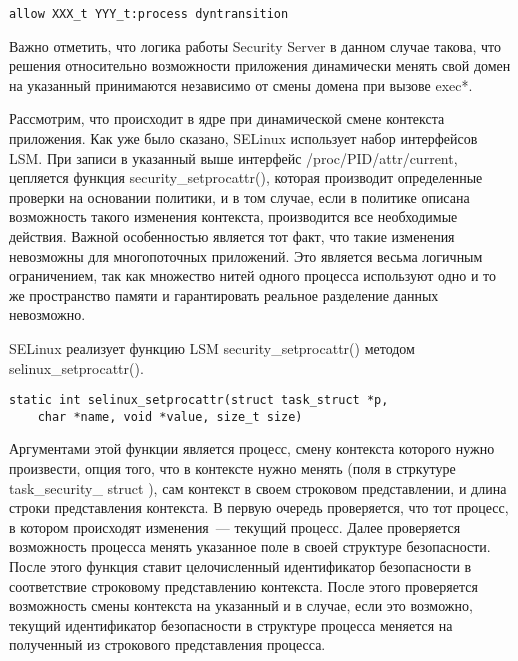 \bigskip
\begin{lstlisting}
allow XXX_t YYY_t:process dyntransition
\end{lstlisting}

\bigskip
Важно отметить, что логика работы Security Server в 
данном случае такова, что решения относительно возможности
приложения динамически менять свой домен на указанный
принимаются независимо от смены домена при вызове exec*. 

Рассмотрим, что происходит в ядре при динамической смене
контекста приложения. Как уже было сказано, SELinux 
использует набор интерфейсов LSM. При записи в указанный 
выше интерфейс /proc/PID/attr/current, цепляется функция
security\_setprocattr(), которая производит определенные 
проверки на основании политики, и в том случае, если 
в политике описана возможность такого изменения контекста, 
производится все необходимые действия. Важной особенностью
является тот факт, что такие изменения невозможны для 
многопоточных приложений. Это является весьма логичным 
ограничением, так как множество нитей одного процесса 
используют одно и то же пространство памяти и гарантировать
реальное разделение данных невозможно. 

SELinux реализует функцию LSM security\_setprocattr()
методом selinux\_setprocattr(). 

\bigskip 
\begin{lstlisting}
static int selinux_setprocattr(struct task_struct *p,
	char *name, void *value, size_t size)
\end{lstlisting}

\bigskip
Аргументами этой функции является процесс, смену 
контекста которого нужно произвести, опция того, что 
в контексте нужно менять (поля в стркутуре task\_security\_ struct ),
сам контекст в своем строковом представлении, и 
длина строки представления контекста. В первую очередь
проверяется, что тот процесс, в котором происходят изменения~---
текущий процесс. Далее проверяется возможность процесса менять
указанное поле в своей структуре безопасности. После этого 
функция ставит целочисленный идентификатор безопасности в 
соответствие строковому представлению контекста. После этого 
проверяется возможность смены контекста на указанный и 
в случае, если это возможно, текущий идентификатор безопасности 
в структуре процесса меняется на полученный из строкового 
представления процесса. 

